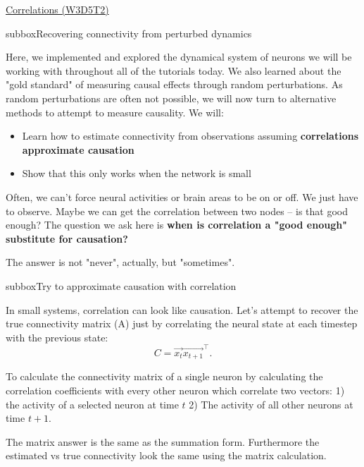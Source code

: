 \begin{textbox}{\href{https://compneuro.neuromatch.io/tutorials/W3D5_NetworkCausality/student/W3D5_Tutorial2.html}{Correlations (W3D5T2)}   }

\begin{subbox}{subbox}{Recovering connectivity from perturbed dynamics}
\scriptsize


Here, we implemented and explored the dynamical system of neurons we will be working with throughout all of the tutorials today. We also learned about the "gold standard" of measuring causal effects through random perturbations. As random perturbations are often not possible, we will now turn to alternative methods to attempt to measure causality. We will:

\begin{itemize}
    \item  Learn how to estimate connectivity from observations assuming \textbf{correlations approximate causation}
\item Show that this only works when the network is small
\end{itemize}


Often, we can't force neural activities or brain areas to be on or off. We just have to observe. Maybe we can get the correlation between two nodes -- is that good enough? The question we ask here is \textbf{when is correlation a "good enough" substitute for causation?}

The answer is not "never", actually, but "sometimes".
\end{subbox}
\begin{subbox}{subbox}{Try to approximate causation with correlation}
\scriptsize



In small systems, correlation can look like causation. Let's attempt to recover the true connectivity matrix (A) just by correlating the neural state at each timestep with the previous state: $$C=\vec{x_t}{\vec{x_{t+1}}^\top}.$$ 

To calculate the connectivity matrix of a single neuron by calculating the correlation coefficients with every other neuron which correlate two vectors: 1) the activity of a selected neuron at time $t$ 2) The activity of all other neurons at time $t+1$.

The matrix answer is the same as the summation form.
Furthermore the estimated vs true connectivity look the same using the matrix calculation.

\begin{center}
    

\end{center}
\end{subbox}
\end{textbox}
